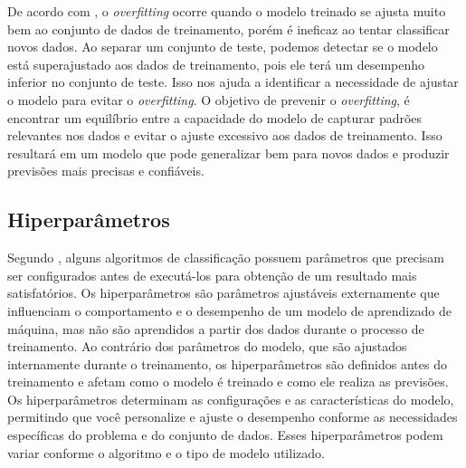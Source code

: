 \documentclass[12pt,oneside,a4paper,chapter=TITLE,
			   english,brazil]{abntex2}
\begin{document}
De acordo com  , o  \textit{overfitting} ocorre quando o modelo treinado se ajusta muito bem ao
conjunto de dados de treinamento, porém é ineficaz ao tentar classificar novos dados. Ao separar um conjunto de teste, podemos detectar se o modelo está superajustado aos dados de treinamento, pois ele terá um desempenho inferior no conjunto de teste. Isso nos ajuda a identificar a necessidade de ajustar o modelo para evitar o \textit{overfitting}.  O objetivo de prevenir o \textit{overfitting}, é encontrar um equilíbrio entre a capacidade do modelo de capturar padrões relevantes nos dados e evitar o ajuste excessivo aos dados de treinamento. Isso resultará em um modelo que pode generalizar bem para novos dados e produzir previsões mais precisas e confiáveis.





\subsection{Hiperparâmetros}

 Segundo , alguns algoritmos de classificação possuem parâmetros que precisam ser
configurados antes de executá-los para obtenção de um resultado mais satisfatórios. Os hiperparâmetros são parâmetros ajustáveis externamente que influenciam o comportamento e o desempenho de um modelo de aprendizado de máquina, mas não são aprendidos a partir dos dados durante o processo de treinamento. Ao contrário dos parâmetros do modelo, que são ajustados internamente durante o treinamento, os hiperparâmetros são definidos antes do treinamento e afetam como o modelo é treinado e como ele realiza as previsões.  Os hiperparâmetros determinam as configurações e as características do modelo, permitindo que você personalize e ajuste o desempenho  conforme as necessidades específicas do problema e do conjunto de dados. Esses hiperparâmetros podem variar conforme o algoritmo e o tipo de modelo utilizado.

\end{document}
